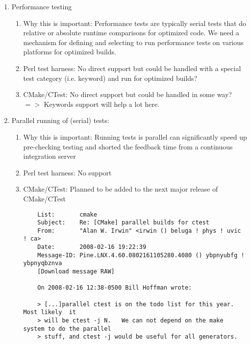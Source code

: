 \documentclass[pdf,ps2pdf,11pt]{SANDreport}
\begin{document}
\begin{enumerate}

{}\item Performance testing

  \begin{enumerate}

  {}\item Why this is important: Performance tests are typically
  serial tests that do relative or absolute runtime comparisons for
  optimized code.  We need a mechanism for defining and selecting to
  run performance tests on various platforms for optimized builds.

  {}\item Perl test harness: No direct support but could be handled
  with a special test category (i.e. keyword) and run for optimized
  builds?

  {}\item CMake/CTest: No direct support but could be handled in
  some way? $=>$ Keywords support will help a lot here.

  \end{enumerate}

{}\item Parallel running of (serial) tests:

  \begin{enumerate}

  {}\item Why this is important: Running tests is parallel can
  significantly speed up pre-checking testing and shorted the
  feedback time from a continuous integration server

  {}\item Perl test harness: No support

  {}\item CMake/CTest: Planned to be added to the next major release
  of CMake/CTest
    
    {\scriptsize\begin{verbatim}
    List:       cmake
    Subject:    Re: [CMake] parallel builds for ctest
    From:       "Alan W. Irwin" <irwin () beluga ! phys ! uvic ! ca>
    Date:       2008-02-16 19:22:39
    Message-ID: Pine.LNX.4.60.0802161105280.4080 () ybpnyubfg ! ybpnyqbznva
    [Download message RAW]
    
    On 2008-02-16 12:38-0500 Bill Hoffman wrote:
    
    > [...]parallel ctest is on the todo list for this year.  Most likely  it 
    > will be ctest -j N.   We can not depend on the make system to do the parallel 
    > stuff, and ctest -j would be useful for all generators.
    

\end{verbatim}}
\end{enumerate}
\end{enumerate}
\end{document}
